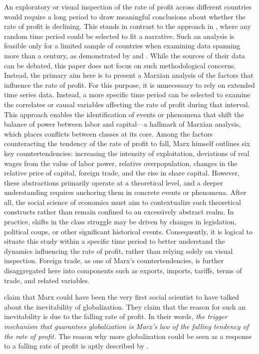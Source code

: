 \documentclass[10pt]{article}
\begin{document}
\par An exploratory or visual inspection of the rate of profit across different countries would require a long period to draw meaningful conclusions about whether the rate of profit is declining. This stands in contrast to the approach in \citet{rotta2024was}, where any random time period could be selected to fit a narrative. Such an analysis is feasible only for a limited sample of countries when examining data spanning more than a century, as demonstrated by \citet{li2007long} and \citet{maito2016distribucion}. While the sources of their data can be debated, this paper does not focus on such methodological concerns. Instead, the primary aim here is to present a Marxian analysis of the factors that influence the rate of profit. For this purpose, it is unnecessary to rely on extended time series data. Instead, a more specific time period can be selected to examine the correlates or causal variables affecting the rate of profit during that interval. This approach enables the identification of events or phenomena that shift the balance of power between labor and capital—a hallmark of Marxian analysis, which places conflicts between classes at its core. Among the factors counteracting the tendency of the rate of profit to fall, Marx himself outlines six key countertendencies: increasing the intensity of exploitation, deviations of real wages from the value of labor power, relative overpopulation, changes in the relative price of capital, foreign trade, and the rise in share capital. However, these abstractions primarily operate at a theoretical level, and a deeper understanding requires anchoring them in concrete events or phenomena. After all, the social science of economics must aim to contextualize such theoretical constructs rather than remain confined to an excessively abstract realm. In practice, shifts in the class struggle may be driven by changes in legislation, political coups, or other significant historical events. Consequently, it is logical to situate this study within a specific time period to better understand the dynamics influencing the rate of profit, rather than relying solely on visual inspection. Foreign trade, as one of Marx’s countertendencies, is further disaggregated here into components such as exports, imports, tariffs, terms of trade, and related variables. 
\par \citet{JellissenGottheil2009} claim that Marx could have been the very first social scientist to have talked about the inevitability of globalization. They claim that the reason for such an inevitability is due to the falling rate of profit. In their words, \textit{the trigger mechanism that guarantees globalization is Marx's law of the falling tendency of the rate of profit.} The reason why more globalization could be seen as a response to a falling rate of profit is aptly described by \citet{mandel1962marxist}. 
\end{document}
